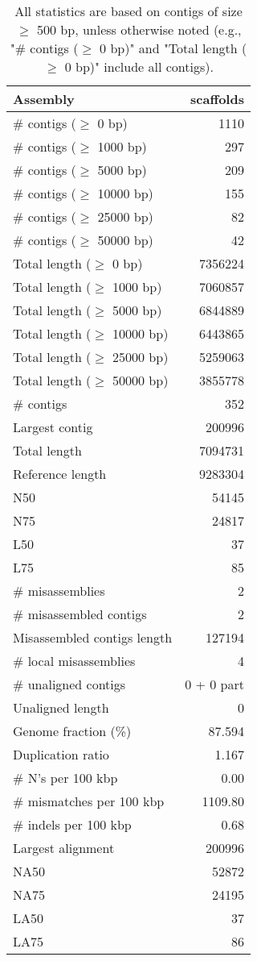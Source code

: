 \documentclass[12pt,a4paper]{article}
\begin{document}
\begin{table}[ht]
\begin{center}
\caption{All statistics are based on contigs of size $\geq$ 500 bp, unless otherwise noted (e.g., "\# contigs ($\geq$ 0 bp)" and "Total length ($\geq$ 0 bp)" include all contigs).}
\begin{tabular}{|l*{1}{|r}|}
\hline
Assembly & scaffolds \\ \hline
\# contigs ($\geq$ 0 bp) & 1110 \\ \hline
\# contigs ($\geq$ 1000 bp) & 297 \\ \hline
\# contigs ($\geq$ 5000 bp) & 209 \\ \hline
\# contigs ($\geq$ 10000 bp) & 155 \\ \hline
\# contigs ($\geq$ 25000 bp) & 82 \\ \hline
\# contigs ($\geq$ 50000 bp) & 42 \\ \hline
Total length ($\geq$ 0 bp) & 7356224 \\ \hline
Total length ($\geq$ 1000 bp) & 7060857 \\ \hline
Total length ($\geq$ 5000 bp) & 6844889 \\ \hline
Total length ($\geq$ 10000 bp) & 6443865 \\ \hline
Total length ($\geq$ 25000 bp) & 5259063 \\ \hline
Total length ($\geq$ 50000 bp) & 3855778 \\ \hline
\# contigs & 352 \\ \hline
Largest contig & 200996 \\ \hline
Total length & 7094731 \\ \hline
Reference length & 9283304 \\ \hline
N50 & 54145 \\ \hline
N75 & 24817 \\ \hline
L50 & 37 \\ \hline
L75 & 85 \\ \hline
\# misassemblies & 2 \\ \hline
\# misassembled contigs & 2 \\ \hline
Misassembled contigs length & 127194 \\ \hline
\# local misassemblies & 4 \\ \hline
\# unaligned contigs & 0 + 0 part \\ \hline
Unaligned length & 0 \\ \hline
Genome fraction (\%) & 87.594 \\ \hline
Duplication ratio & 1.167 \\ \hline
\# N's per 100 kbp & 0.00 \\ \hline
\# mismatches per 100 kbp & 1109.80 \\ \hline
\# indels per 100 kbp & 0.68 \\ \hline
Largest alignment & 200996 \\ \hline
NA50 & 52872 \\ \hline
NA75 & 24195 \\ \hline
LA50 & 37 \\ \hline
LA75 & 86 \\ \hline
\end{tabular}
\end{center}
\end{table}
\end{document}
